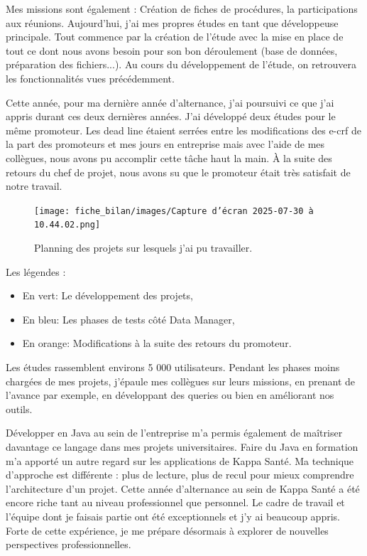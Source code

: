 Mes missions sont également : Création de fiches de procédures, la participations aux réunions. 
Aujourd’hui, j’ai mes propres études en tant que développeuse principale. Tout commence par la création de l’étude avec la mise en place de tout ce dont nous avons besoin pour son bon déroulement (base de données, préparation des fichiers...). Au cours du développement de l’étude, on retrouvera les fonctionnalités vues précédemment.
\vspace{0.5cm}

Cette année, pour ma dernière année d'alternance, j'ai poursuivi ce que j'ai appris durant ces deux dernières années. J'ai développé deux études pour le même promoteur. Les dead line étaient serrées entre les modifications des e-crf de la part des promoteurs et mes jours en entreprise mais avec l'aide de mes collègues, nous avons pu accomplir cette tâche haut la main. À la suite des retours du chef de projet, nous avons su que le promoteur était très satisfait de notre travail. 
\begin{figure}[H]
    \centering
    \texttt{[image: fiche\_bilan/images/Capture d’écran 2025-07-30 à 10.44.02.png]} 
    \caption{Planning des projets sur lesquels j'ai pu travailler.}
\end{figure}
Les légendes :
\begin{itemize}
    \item En vert: Le développement des projets,
    \item En bleu: Les phases de tests côté Data Manager,
    \item En orange: Modifications à la suite des retours du promoteur.
\end{itemize}
Les études rassemblent environs 5 000 utilisateurs. Pendant les phases moins chargées de mes projets, j'épaule mes collègues sur leurs missions, en prenant de l'avance par exemple, en développant des queries ou bien en améliorant nos outils.


\vspace{0.5cm}
Développer en Java au sein de l’entreprise m’a permis également de maîtriser davantage ce langage dans mes projets universitaires. Faire du Java en formation m’a apporté un autre regard sur les applications de Kappa Santé. Ma technique d’approche est différente : plus de lecture, plus de recul pour mieux comprendre l’architecture d’un projet. 
Cette année d’alternance au sein de Kappa Santé a été encore riche tant au niveau professionnel que personnel.
Le cadre de travail et l’équipe dont je faisais partie ont été exceptionnels et j’y ai beaucoup appris. 
Forte de cette expérience, je me prépare désormais à explorer de nouvelles perspectives professionnelles.
